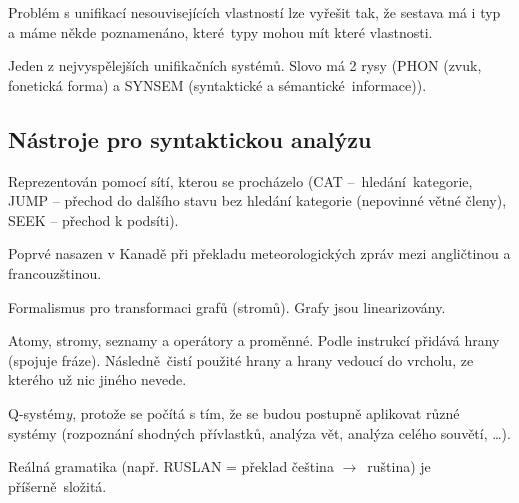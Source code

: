 \documentclass[12pt]{article}					%
\begin{document}
\begin{definice}
	Problém s unifikací nesouvisejících vlastností lze vyřešit tak, že sestava má i typ a máme někde poznamenáno, které typy mohou mít které vlastnosti.
\end{definice}

\begin{definice}[HPSG]
	Jeden z nejvyspělejších unifikačních systémů. Slovo má 2 rysy (PHON (zvuk, fonetická forma) a SYNSEM (syntaktické a sémantické informace)).
\end{definice}

	\subsection{Nástroje pro syntaktickou analýzu}
	\begin{definice}
		Reprezentován pomocí sítí, kterou se procházelo (CAT – hledání kategorie, JUMP – přechod do dalšího stavu bez hledání kategorie (nepovinné větné členy), SEEK – přechod k podsíti).
	\end{definice}

	\begin{definice}
		Poprvé nasazen v Kanadě při překladu meteorologických zpráv mezi angličtinou a francouzštinou.

		Formalismus pro transformaci grafů (stromů). Grafy jsou linearizovány.

		Atomy, stromy, seznamy a operátory a proměnné. Podle instrukcí přidává hrany (spojuje fráze). Následně čistí použité hrany a hrany vedoucí do vrcholu, ze kterého už nic jiného nevede.

		Q-systém\emph{y}, protože se počítá s tím, že se budou postupně aplikovat různé systémy (rozpoznání shodných přívlastků, analýza vět, analýza celého souvětí, …).

		Reálná gramatika (např. RUSLAN = překlad čeština $\rightarrow$ ruština) je příšerně složitá.
	\end{definice}
\end{document}
